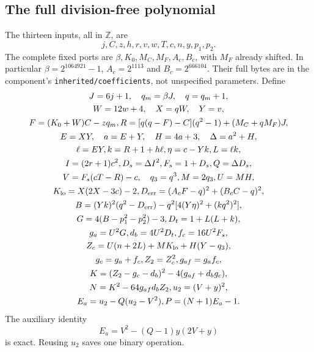 \subsection{The full division-free polynomial}
The thirteen inputs, all in $\mathbb Z$, are
\[
 j,C,z,h,r,v,w,T,c,n,y,p_1,p_2.
\]
The complete fixed ports are $\beta,K_0,M_C,M_F,A_c,B_c$, with $M_F$ already
shifted. In particular $\beta=2^{1064921}-1$, $A_c=2^{1113}$ and
$B_c=2^{666104}$. Their full bytes are in the component's
\texttt{inherited/coefficients}, not unspecified parameters. Define
\begin{gather*}
 J=6j+1,\quad q_m=\beta J,\quad q=q_m+1,\\
 W=12w+4,\quad X=qW,\quad Y=v,\\
 F=(K_0+W)C-zq_m,
 R=[q(q-F)-C](q^2-1)+(M_C+qM_F)J,\\
 E=XY,\quad a=E+Y,\quad H=4a+3,\quad \Delta=a^2+H,\\
 \ell=EY,k=R+1+h\ell,\eta=c-Yk,L=\ell k,\\
 I=(2r+1)c^2,D_s=\Delta I^2,F_s=1+D_s,Q=\Delta D_s,\\
 V=F_s(cT-R)-c,\quad q_3=q^3,M=2q_3,U=MH,\\
 K_{\rm lo}=X(2X-3c)-2,
 D_{\rm err}=(A_cF-q)^2+(B_cC-q)^2,\\
 B=(Yk)^2(q^2-D_{\rm err})-q^2[4(Y\eta)^2+(kq^2)^2],\\
 G=4(B-p_1^2-p_2^2)-3,D_t=1+L(L+k),\\
 g_a=U^2G,d_b=4U^2D_t,f_c=16U^2F_s,\\
 Z_c=U(n+2L)+MK_{\rm lo}+H(Y-q_3),\\
 g_c=g_a+f_c,Z_2=Z_c^2,g_{af}=g_af_c,\\
 K=(Z_2-g_c-d_b)^2-4(g_{af}+d_bg_c),\\
 N=K^2-64g_{af}d_bZ_2,u_2=(V+y)^2,\\
 E_a=u_2-Q(u_2-V^2),P=(N+1)E_a-1.
\end{gather*}
The auxiliary identity
\begin{equation}\label{eq:roots-aux119}
 E_a=V^2-(Q-1)y(2V+y)
\end{equation}
is exact. Reusing $u_2$ saves one binary operation.

